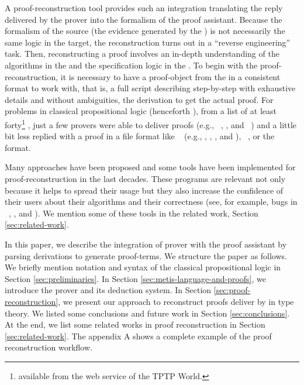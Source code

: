 \documentclass[../main.tex]{subfiles}
\begin{document}
A proof-reconstruction tool provides such an integration translating
the reply delivered by the prover into the formalism of the proof
assistant. Because the formalism of the source (the evidence
generated by the \ATP) is not necessarily the same logic in the
target, the reconstruction turns out in a ``reverse engineering''
task. Then, reconstructing a proof involves an in-depth
understanding of the algorithms in the \ATP and the specification
logic in the \ITP. To begin with the proof-reconstruction, it is
necessary to have a proof-object from the \ATP in a consistent
format to work with, that is, a full script describing step-by-step
with exhaustive details and without ambiguities, the derivation to
get the actual proof.
For problems in classical propositional logic (henceforth \CPL),
from a list of at least forty\footnote{\ATPs available from the web
service  of the TPTP World.} \ATPs, just a few
provers were able to deliver proofs (e.g.,
~\cite{Barrett2011}, , and
~\cite{hillenbrand1997}) and a little bit less replied with a proof
in a file format like \TSTP~\cite{sutcliffe2004tstp} (e.g.,
, \Metis, , and ),
~\cite{Stump2008}, or the ~\cite{Bohme2011} format.

Many approaches have been proposed and some tools have been
implemented for proof-reconstruction in the last decades. These
programs are relevant not only because it helps to spread their
usage but they also increase the confidence of their users about
their algorithms and their correctness (see, for example, bugs in
\ATPs~\cite{Keller2013}, \cite{Bohme2011}, \cite{Fleury2014} and
\cite{Kanso2012}). We mention some of these tools in the related
work, Section \ref{sec:related-work}.

In this paper, we describe the integration of \Metis prover with the
proof assistant \Agda by parsing \TSTP derivations to generate \Agda
proof-terms. We structure the paper as follows.
We briefly mention notation and syntax of the classical propositional
logic in Section \ref{sec:preliminaries}.
In Section \ref{sec:metis-language-and-proofs}, we introduce the
\Metis prover and its deduction system.
In Section \ref{sec:proof-reconstruction}, we present our
approach to reconstruct proofs deliver by \Metis in type theory.
We listed some conclusions and future work in Section
\ref{sec:conclusions}. At the end, we list some related works in
proof reconstruction in Section \ref{sec:related-work}.
The appendix \textsc{A} shows a complete example of the proof
reconstruction workflow.
\end{document}
